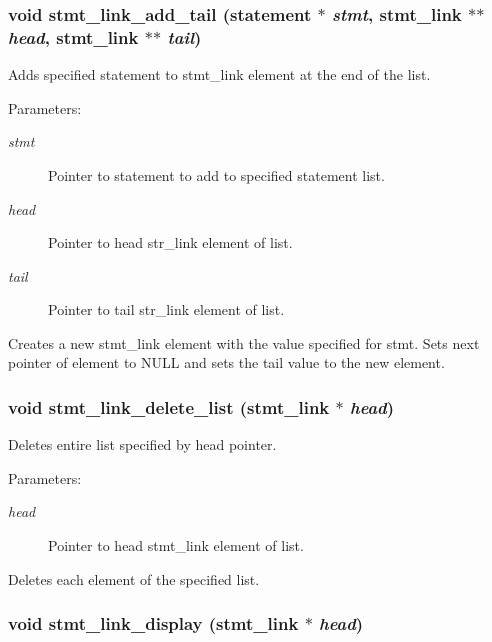 \subsubsection{\setlength{\rightskip}{0pt plus 5cm}void stmt\_\-link\_\-add\_\-tail ({\bf statement} $\ast$ {\em stmt}, {\bf stmt\_\-link} $\ast$$\ast$ {\em head}, {\bf stmt\_\-link} $\ast$$\ast$ {\em tail})}\label{link_8c_a2}


Adds specified statement to stmt\_\-link element at the end of the list.

\begin{Desc}
\item[Parameters: ]\par
\begin{description}
\item[{\em 
stmt}]Pointer to statement to add to specified statement list. \item[{\em 
head}]Pointer to head str\_\-link element of list. \item[{\em 
tail}]Pointer to tail str\_\-link element of list.\end{description}
\end{Desc}
Creates a new stmt\_\-link element with the value specified for stmt. Sets next pointer of element to NULL and sets the tail value to the new element. 
\subsubsection{\setlength{\rightskip}{0pt plus 5cm}void stmt\_\-link\_\-delete\_\-list ({\bf stmt\_\-link} $\ast$ {\em head})}\label{link_8c_a19}


Deletes entire list specified by head pointer.

\begin{Desc}
\item[Parameters: ]\par
\begin{description}
\item[{\em 
head}]Pointer to head stmt\_\-link element of list.\end{description}
\end{Desc}
Deletes each element of the specified list. 
\subsubsection{\setlength{\rightskip}{0pt plus 5cm}void stmt\_\-link\_\-display ({\bf stmt\_\-link} $\ast$ {\em head})}\label{link_8c_a7}


